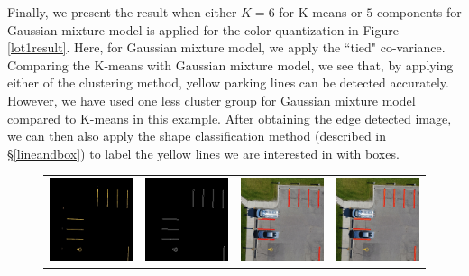 \documentclass{m2pi}
\begin{document}
Finally, we present the result when either $ K=  6$ for K-means or
$5$ components for Gaussian mixture model is applied for the color 
quantization in Figure \ref{lot1result}. Here, for Gaussian mixture 
model,  we apply the ``tied" co-variance. 
Comparing the K-means with Gaussian mixture model, we see that, by applying 
either of the clustering method, yellow parking lines 
can be detected accurately. However, we have used one less
cluster group for Gaussian mixture model compared to K-means
in this example. 
After obtaining the edge detected image, we can then also apply 
the shape classification method (described in \S \ref{lineandbox}) to label
the yellow lines we are interested in with boxes. 


\begin{figure}[htp]
\centering
\begin{tabular}{cccc}
\includegraphics[width=3.5cm]{figures/Masked_Lot1.jpg}&
\includegraphics[width=3.5cm]{figures/Edge_Lot1.jpg}&
\includegraphics[width=3.5cm]{figures/Detected_Lot1.jpg}&
\includegraphics[width=3.5cm]{figures/Boxed_line_Lot1.jpg}\\

\end{tabular}
\end{figure}
\end{document}
